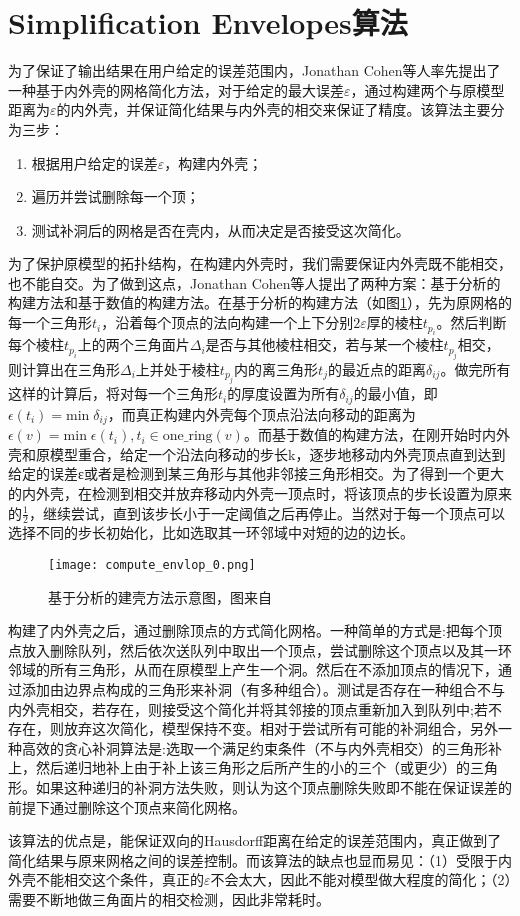 \section{Simplification Envelopes算法}
为了保证了输出结果在用户给定的误差范围内，Jonathan Cohen等人率先提出了一种基于内外壳的网格简化方法\cite{simp-envlop}，对于给定的最大误差$\varepsilon$，通过构建两个与原模型距离为$\varepsilon$的内外壳，并保证简化结果与内外壳的相交来保证了精度。该算法主要分为三步：
\begin{enumerate}[（1）]
  \item 根据用户给定的误差$\varepsilon$，构建内外壳；
  \item 遍历并尝试删除每一个顶；
  \item 测试补洞后的网格是否在壳内，从而决定是否接受这次简化。
\end{enumerate}
为了保护原模型的拓扑结构，在构建内外壳时，我们需要保证内外壳既不能相交，也不能自交。为了做到这点，Jonathan Cohen等人提出了两种方案：基于分析的构建方法和基于数值的构建方法。在基于分析的构建方法（如图\ref{fig:compute-envlop0}），先为原网格的每一个三角形$t_i$，沿着每个顶点的法向构建一个上下分别$2\varepsilon$厚的棱柱$t_{p_i}$。然后判断每个棱柱$t_{p_i}$上的两个三角面片$\Delta_i$是否与其他棱柱相交，若与某一个棱柱$t_{p_j}$相交，则计算出在三角形$\Delta_i$上并处于棱柱$t_{p_j}$内的离三角形$t_j$的最近点的距离$\delta_{ij}$。做完所有这样的计算后，将对每一个三角形$t_i$的厚度设置为所有$\delta_{ij}$的最小值，即$\epsilon(t_i) = \text{min} \; \delta_{ij}$，而真正构建内外壳每个顶点沿法向移动的距离为$\epsilon(v) = \text{min} \; \epsilon(t_i),t_i \in \text{one\_ring}(v)$。而基于数值的构建方法，在刚开始时内外壳和原模型重合，给定一个沿法向移动的步长k，逐步地移动内外壳顶点直到达到给定的误差ε或者是检测到某三角形与其他非邻接三角形相交。为了得到一个更大的内外壳，在检测到相交并放弃移动内外壳一顶点时，将该顶点的步长设置为原来的$\frac{1}{2}$，继续尝试，直到该步长小于一定阈值之后再停止。当然对于每一个顶点可以选择不同的步长初始化，比如选取其一环邻域中对短的边的边长。\par
\begin{figure}[htbp]
    \centering
    \texttt{[image: compute\_envlop\_0.png]}
    \caption{基于分析的建壳方法示意图，图来自\cite{simp-envlop}}
    \label{fig:compute-envlop0}
\end{figure}
构建了内外壳之后，通过删除顶点的方式简化网格。一种简单的方式是:把每个顶点放入删除队列，然后依次送队列中取出一个顶点，尝试删除这个顶点以及其一环邻域的所有三角形，从而在原模型上产生一个洞。然后在不添加顶点的情况下，通过添加由边界点构成的三角形来补洞（有多种组合）。测试是否存在一种组合不与内外壳相交，若存在，则接受这个简化并将其邻接的顶点重新加入到队列中;若不存在，则放弃这次简化，模型保持不变。相对于尝试所有可能的补洞组合，另外一种高效的贪心补洞算法是:选取一个满足约束条件（不与内外壳相交）的三角形补上，然后递归地补上由于补上该三角形之后所产生的小的三个（或更少）的三角形。如果这种递归的补洞方法失败，则认为这个顶点删除失败即不能在保证误差的前提下通过删除这个顶点来简化网格。\par
该算法的优点是，能保证双向的Hausdorff距离在给定的误差范围内，真正做到了简化结果与原来网格之间的误差控制。而该算法的缺点也显而易见：（1）受限于内外壳不能相交这个条件，真正的$\varepsilon$不会太大，因此不能对模型做大程度的简化；（2）需要不断地做三角面片的相交检测，因此非常耗时。

